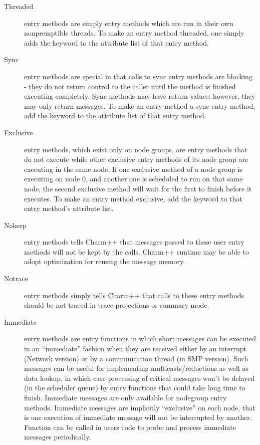 \begin{description}
\item[Threaded] entry methods are simply entry
methods which are run in their own nonpremptible threads.  To make an
entry method threaded, one simply adds the keyword
 to the attribute list of that entry method.

\item[Sync] entry methods are special in that calls to
sync entry methods are blocking - they do not return control to the caller
until the method is finished executing completely.  Sync methods may have
return values; however, they may only return messages.  To make an entry method a sync entry method, add the keyword  to the
attribute list of that entry method.

\item[Exclusive] entry methods, which exist only on node groups, are
entry methods that do not execute while other exclusive
entry methods of its node group are executing in the same
node.  If one exclusive method of a node group is executing on node 0, and
another one is scheduled to run on that same node, the second exclusive method
will wait for the first to finish before it executes.  To make an entry method exclusive, add the keyword  to that
entry method's attribute list.

\item[Nokeep] entry methods tells Charm++ that messages passed to
these user entry methods will not be kept by the calls. Charm++ runtime
may be able to adopt optimization for reusing the message memory.

\item[Notrace] entry methods simply tells Charm++ that calls to 
these entry methods should be not traced in trace projections or summary mode.

\item[Immediate] entry methods are entry functions in which 
short messages can be executed in an ``immediate'' fashion when they are
received either by an interrupt (Network version) or by a communication thread
(in SMP version). Such messages can be useful for implementing
multicasts/reductions as well as data lookup, in which case processing of
critical messages won't be delayed (in the scheduler queue) by entry functions
that could take long time to finish. Immediate messages are only available for
nodegroup entry methods. Immediate messages are implicitly ``exclusive'' on each
node, that is one execution of immediate message will not be interrupted by
another. Function  can be called in users code to
probe and process immediate messages periodically.


\end{description}

